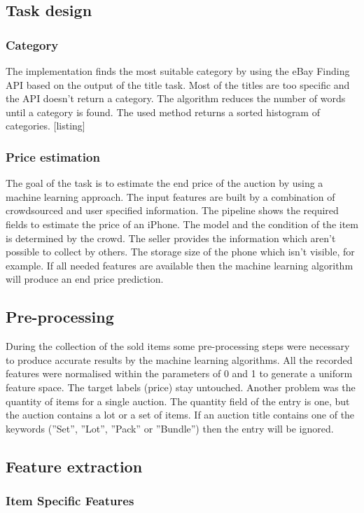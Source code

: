 \subsection{Task design}
\subsubsection{Category}
The implementation finds the most suitable category by using the eBay Finding API based on the output of the title task. Most of the titles are too specific and the API doesn't return a category. The algorithm reduces the number of words until a category is found. The used method returns a sorted histogram of categories.
[listing]
\subsubsection{Price estimation}
The goal of the task is to estimate the end price of the auction by using a machine learning approach. The input features are built by a combination of crowdsourced and user specified information. The pipeline shows the required fields to estimate the price of an iPhone. The model and the condition of the item is determined by the crowd. The seller provides the information which aren't possible to collect by others. The storage size of the phone which isn't visible, for example. If all needed features are available then the machine learning algorithm will produce an end price prediction.
\subsection{Pre-processing}
During the collection of the sold items some pre-processing steps were necessary to produce accurate results by the machine learning algorithms. All the recorded features were normalised within the parameters of 0 and 1 to generate a uniform feature space. The target labels (price) stay untouched. 
Another problem was the quantity of items for a single auction. The quantity field of the entry is one, but the auction contains a lot or a set of items. If an auction title contains one of the keywords (''Set'', ''Lot'', ''Pack'' or ''Bundle'') then the entry will be ignored.
\subsection{Feature extraction}
\subsubsection{Item Specific Features}
